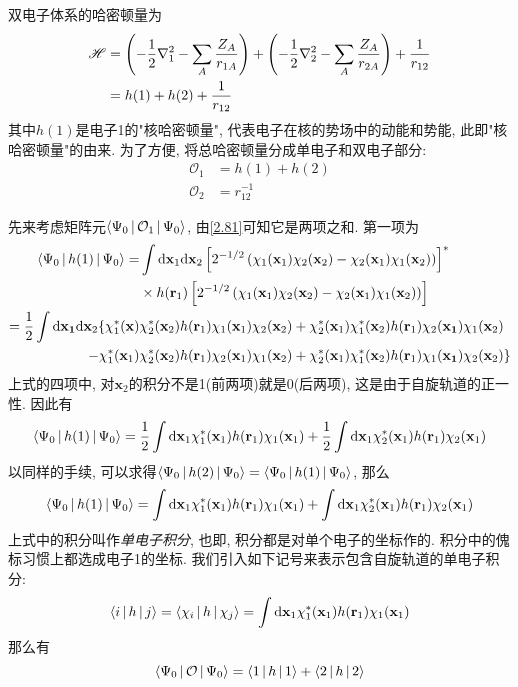 双电子体系的哈密顿量为
\begin{align}
\mathscr{H}&=\left( -\frac{1}{2}\nabla_1^2 - \sum_A\frac{Z_A}{r_{1A}} \right) + \left( -\frac{1}{2}\nabla_2^2 - \sum_A\frac{Z_A}{r_{2A}} \right) + \frac{1}{r_{12}}\notag\\
&=h(1) + h(2) + \frac{1}{r_{12}}
\end{align}
其中$h(1)$是电子1的"核哈密顿量", 代表电子在核的势场中的动能和势能, 此即"核哈密顿量"的由来. 为了方便, 将总哈密顿量分成单电子和双电子部分:
\begin{align}
\mathcal{O}_1&=h(1)+h(2)\\
\mathcal{O}_2&=r_{12}^{-1}
\end{align}

先来考虑矩阵元$\Braket{\Psi_0|\mathcal{O}_1|\Psi_0}$, 由\ref{2.81}可知它是两项之和. 第一项为
\begin{align}
\braket{\Psi_0|h(1)|\Psi_0}=&\int\db{x}_1\db{x}_2\left[2^{-1/2}\left(\chi_1(\mathbf{x}_1)\chi_2(\mathbf{x}_2)-\chi_2(\mathbf{x}_1)\chi_1(\mathbf{x}_2)\right)\right]^*\notag\\
\qquad&\times h(\mathbf{r}_1)\left[ 2^{-1/2}\left(\chi_1(\mathbf{x}_1)\chi_2(\mathbf{x}_2)-\chi_2(\mathbf{x}_1)\chi_1(\mathbf{x}_2)\right)\right]\notag\\
=\frac{1}{2}\int\dd{\mathbf{x}_1}\dd\mathbf{x}_2\{\chi_1^*(\mathbf{x})&\chi_2^*(\mathbf{x}_2)h(\mathbf{r}_1)\chi_1(\mathbf{x}_1)\chi_2(\mathbf{x}_2) + \chi_2^*(\mathbf{x}_1)\chi_1^*(\mathbf{x}_2)h(\mathbf{r}_1)\chi_2(\mathbf{x_1})\chi_1(\mathbf{x}_2) \notag\\
 - \chi_1^*(\mathbf{x}_1)&\chi_2^*(\mathbf{x}_2)h(\mathbf{r}_1)\chi_2(\mathbf{x}_1)\chi_1(\mathbf{x}_2) + \chi_2^*(\mathbf{x}_1)\chi_1^*(\mathbf{x}_2)h(\mathbf{r}_1)\chi_1(\mathbf{x_1})\chi_2(\mathbf{x}_2)
\}
\end{align}
上式的四项中, 对$\mathbf{x}_2$的积分不是1(前两项)就是0(后两项), 这是由于自旋轨道的正一性. 因此有
\begin{equation}
\braket{\Psi_0|h(1)|\Psi_0}=\frac{1}{2}\int\dd\mathbf{x}_1\chi_1^*(\mathbf{x}_1)h(\mathbf{r}_1)\chi_1(\mathbf{x}_1)+\frac{1}{2}\int\dd\mathbf{x}_1\chi_2^*(\mathbf{x}_1)h(\mathbf{r}_1)\chi_2(\mathbf{x}_1)
\end{equation}
以同样的手续, 可以求得$\Braket{\Psi_0|h(2)|\Psi_0}=\Braket{\Psi_0|h(1)|\Psi_0}$, 那么
\begin{equation}
\braket{\Psi_0|h(1)|\Psi_0}=\int\dd\mathbf{x}_1\chi_1^*(\mathbf{x}_1)h(\mathbf{r}_1)\chi_1(\mathbf{x}_1) + \int\dd\mathbf{x}_1\chi_2^*(\mathbf{x}_1)h(\mathbf{r}_1)\chi_2(\mathbf{x}_1)
\end{equation}
上式中的积分叫作\emph{单电子积分}, 也即, 积分都是对单个电子的坐标作的. 积分中的傀标习惯上都选成电子1的坐标. 我们引入如下记号来表示包含自旋轨道的单电子积分:
\begin{equation}
\braket{i|h|j}=\braket{\chi_i|h|\chi_j}=\int\dd\mathbf{x}_1\chi_1^*(\mathbf{x}_1)h(\mathbf{r}_1)\chi_1(\mathbf{x}_1)
\end{equation}
那么有
\begin{equation}
\Braket{\Psi_0|\mathcal{O}|\Psi_0}=\Braket{1|h|1}+\Braket{2|h|2}
\end{equation}

